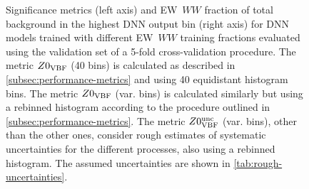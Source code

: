 \begin{figure}[t]
    \caption[Significance and EW~$WW$ fraction for DNN models trained with different EW~$WW$ training fractions.]{Significance metrics (left axis) and EW~$WW$ fraction of total background in the highest DNN output bin (right axis) for DNN models trained with different EW~$WW$ training fractions evaluated using the validation set of a 5-fold cross-validation procedure. The metric $Z0_{\mathrm{VBF}}$ (40 bins) is calculated as described in \cref{subsec:performance-metrics} and using 40 equidistant histogram bins. The metric $Z0_{\mathrm{VBF}}$ (var. bins) is calculated similarly but using a rebinned histogram according to the procedure outlined in \cref{subsec:performance-metrics}. The metric $Z0_{\mathrm{VBF}}^{\mathrm{unc}}$ (var. bins), other than the other ones, consider rough estimates of systematic uncertainties for the different processes, also using a rebinned histogram. The assumed uncertainties are shown in \cref{tab:rough-uncertainties}.}
    \label{fig:ew-fraction-scan}
\end{figure}
